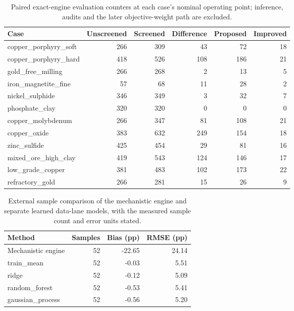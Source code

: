 \begin{table}[htbp]
\centering
\small
\caption{Paired exact-engine evaluation counters at each case's nominal operating point; inference, audits and the later objective-weight path are excluded.}
\label{tab:optimization}
\begin{tabular}{lrrrrr}
\toprule
Case & Unscreened & Screened & Difference & Proposed & Improved \\
\midrule
copper\_porphyry\_soft & 266 & 309 & 43 & 72 & 18 \\
copper\_porphyry\_hard & 418 & 526 & 108 & 186 & 21 \\
gold\_free\_milling & 266 & 268 & 2 & 13 & 5 \\
iron\_magnetite\_fine & 57 & 68 & 11 & 28 & 2 \\
nickel\_sulphide & 346 & 349 & 3 & 32 & 7 \\
phosphate\_clay & 320 & 320 & 0 & 0 & 0 \\
copper\_molybdenum & 266 & 347 & 81 & 108 & 21 \\
copper\_oxide & 383 & 632 & 249 & 154 & 18 \\
zinc\_sulfide & 425 & 454 & 29 & 81 & 16 \\
mixed\_ore\_high\_clay & 419 & 543 & 124 & 146 & 17 \\
low\_grade\_copper & 381 & 483 & 102 & 173 & 22 \\
refractory\_gold & 266 & 281 & 15 & 26 & 9 \\
\bottomrule
\end{tabular}
\end{table}
\begin{table}[htbp]
\centering
\small
\caption{External sample comparison of the mechanistic engine and separate learned data-lane models, with the measured sample count and error units stated.}
\label{tab:measured-data}
\begin{tabular}{lrrr}
\toprule
Method & Samples & Bias (pp) & RMSE (pp) \\
\midrule
Mechanistic engine & 52 & -22.65 & 24.14 \\
train\_mean & 52 & -0.03 & 5.51 \\
ridge & 52 & -0.12 & 5.09 \\
random\_forest & 52 & -0.53 & 5.41 \\
gaussian\_process & 52 & -0.56 & 5.20 \\
\bottomrule
\end{tabular}
\end{table}
